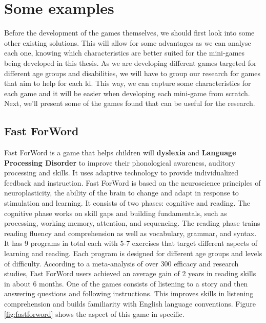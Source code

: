 \section{Some examples}
\label{sec:gamesforld}

Before the development of the games themselves, we should first look into some other existing solutions. This will allow for some advantages as we can analyse each one, knowing which characteristics are better suited for the mini-games being developed in this thesis.
As we are developing different games targeted for different age groups and disabilities, we will have to group our research for games that aim to help for each \gls{ld}. This way, we can capture some characteristics for each game and it will be easier when developing each mini-game from scratch.
Next, we'll present some of the games found that can be useful for the research.

\newpage
\subsection*{Fast ForWord} 

Fast ForWord\cite{fastforword} is a game that helps children will \textbf{dyslexia} and \textbf{Language Processing Disorder} to improve their phonological awareness, auditory processing and skills. It uses adaptive technology to provide individualized feedback and instruction.
Fast  ForWord is based on the neuroscience principles of neuroplasticity, the ability of the brain to change and adapt in response to stimulation and learning. It consists of two phases: cognitive and reading. The cognitive phase works on skill gaps and building fundamentals, such as processing, working memory, attention, and sequencing. The reading phase trains reading fluency and comprehension as well as vocabulary, grammar, and syntax. It has 9 programs in total each with 5-7 exercises that target different aspects of learning and reading. Each program is designed for different age groups and levels of difficulty.
According to a meta-analysis of over 300 efficacy and research studies, Fast ForWord users achieved an average gain of 2 years in reading skills in about 6 months. \cite{gemlearningFastFor}
One of the games consists of listening to a story and then answering questions and following instructions. This improves skills in listening comprehension and builds familiarity with English language conventions. Figure \ref{fig:fastforword} shows the aspect of this game in specific.

